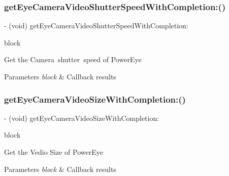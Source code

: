 \subsubsection{\texorpdfstring{get\+Eye\+Camera\+Video\+Shutter\+Speed\+With\+Completion\+:()}{getEyeCameraVideoShutterSpeedWithCompletion:()}}
{\footnotesize\ttfamily -\/ (void) get\+Eye\+Camera\+Video\+Shutter\+Speed\+With\+Completion\+: \begin{DoxyParamCaption}\item[{(void($^\wedge$)(P\+V\+Eye\+Camera\+Video\+Shutter\+Speed video\+Shutter\+Speed, N\+S\+Error $\ast$\+\_\+\+Nullable error))}]{block }\end{DoxyParamCaption}}

Get the Camera shutter speed of Power\+Eye


\begin{DoxyParams}{Parameters}
{\em block} & Callback results \\
\hline
\end{DoxyParams}
\mbox{\label{interface_p_v_eye_camera_ae56b03ae094f2b3b9f9639e67509e430}} 
\subsubsection{\texorpdfstring{get\+Eye\+Camera\+Video\+Size\+With\+Completion\+:()}{getEyeCameraVideoSizeWithCompletion:()}}
{\footnotesize\ttfamily -\/ (void) get\+Eye\+Camera\+Video\+Size\+With\+Completion\+: \begin{DoxyParamCaption}\item[{(void($^\wedge$)(P\+V\+Eye\+Camera\+Video\+Size video\+Size, N\+S\+Error $\ast$\+\_\+\+Nullable error))}]{block }\end{DoxyParamCaption}}

Get the Vedio Size of Power\+Eye


\begin{DoxyParams}{Parameters}
{\em block} & Callback results \\
\hline
\end{DoxyParams}
\mbox{\label{interface_p_v_eye_camera_a82d529ab4f4f245580dc52cd54d7b174}} 
